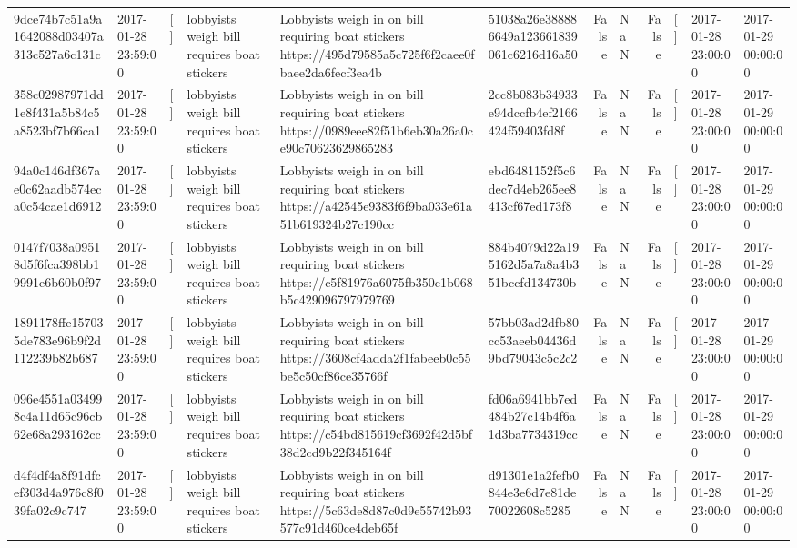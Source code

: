\begin{tabular}{llllllrlrlll}
9dce74b7c51a9a1642088d03407a313c527a6c131c & 2017-01-28 23:59:00 & [] & lobbyists weigh bill requires boat stickers & Lobbyists weigh in on bill requiring boat stickers https://495d79585a5c725f6f2caee0fbaee2da6fecf3ea4b & 51038a26e388886649a123661839061c6216d16a50 & False & NaN & False & [] & 2017-01-28 23:00:00 & 2017-01-29 00:00:00 \\
358c02987971dd1e8f431a5b84c5a8523bf7b66ca1 & 2017-01-28 23:59:00 & [] & lobbyists weigh bill requires boat stickers & Lobbyists weigh in on bill requiring boat stickers https://0989eee82f51b6eb30a26a0ce90c70623629865283 & 2cc8b083b34933e94dccfb4ef2166424f59403fd8f & False & NaN & False & [] & 2017-01-28 23:00:00 & 2017-01-29 00:00:00 \\
94a0c146df367ae0c62aadb574eca0c54cae1d6912 & 2017-01-28 23:59:00 & [] & lobbyists weigh bill requires boat stickers & Lobbyists weigh in on bill requiring boat stickers https://a42545e9383f6f9ba033e61a51b619324b27c190cc & ebd6481152f5c6dec7d4eb265ee8413cf67ed173f8 & False & NaN & False & [] & 2017-01-28 23:00:00 & 2017-01-29 00:00:00 \\
0147f7038a09518d5f6fca398bb19991e6b60b0f97 & 2017-01-28 23:59:00 & [] & lobbyists weigh bill requires boat stickers & Lobbyists weigh in on bill requiring boat stickers https://c5f81976a6075fb350c1b068b5c429096797979769 & 884b4079d22a195162d5a7a8a4b351bccfd134730b & False & NaN & False & [] & 2017-01-28 23:00:00 & 2017-01-29 00:00:00 \\
1891178ffe157035de783e96b9f2d112239b82b687 & 2017-01-28 23:59:00 & [] & lobbyists weigh bill requires boat stickers & Lobbyists weigh in on bill requiring boat stickers https://3608cf4adda2f1fabeeb0c55be5c50cf86ce35766f & 57bb03ad2dfb80cc53aeeb04436d9bd79043c5c2c2 & False & NaN & False & [] & 2017-01-28 23:00:00 & 2017-01-29 00:00:00 \\
096e4551a034998c4a11d65c96cb62e68a293162cc & 2017-01-28 23:59:00 & [] & lobbyists weigh bill requires boat stickers & Lobbyists weigh in on bill requiring boat stickers https://c54bd815619cf3692f42d5bf38d2cd9b22f345164f & fd06a6941bb7ed484b27c14b4f6a1d3ba7734319cc & False & NaN & False & [] & 2017-01-28 23:00:00 & 2017-01-29 00:00:00 \\
d4f4df4a8f91dfcef303d4a976c8f039fa02c9c747 & 2017-01-28 23:59:00 & [] & lobbyists weigh bill requires boat stickers & Lobbyists weigh in on bill requiring boat stickers https://5c63de8d87c0d9e55742b93577c91d460ce4deb65f & d91301e1a2fefb0844e3e6d7e81de70022608c5285 & False & NaN & False & [] & 2017-01-28 23:00:00 & 2017-01-29 00:00:00 \\

\end{tabular}
